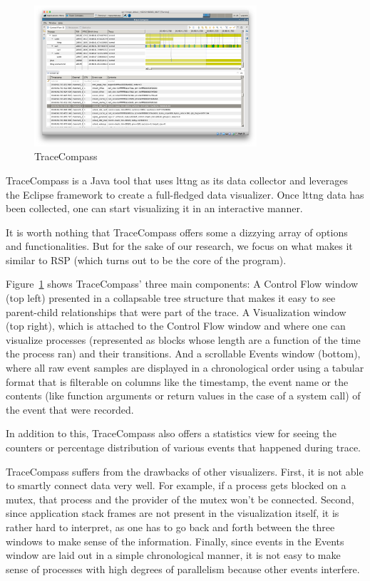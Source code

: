 \documentclass[10pt]{article}
\begin{document}
\begin{figure}[h]
\includegraphics[width=3.25in]{images/tracecompass}
\caption{TraceCompass}
\label{fig:traceCompass}
\end{figure}

TraceCompass\cite{traceCompass} is a Java tool that uses lttng as its data
collector and leverages the Eclipse framework to create a full-fledged data
visualizer. Once lttng data has been collected, one can start visualizing it in
an interactive manner.

It is worth nothing that TraceCompass offers some a dizzying array of options
and functionalities. But for the sake of our research, we focus on what makes
it similar to RSP (which turns out to be the core of the program).

Figure~\ref{fig:traceCompass} shows TraceCompass' three main components: A
Control Flow window (top left) presented in a collapsable tree structure that
makes it easy to see parent-child relationships that were part of the trace. A
Visualization window (top right), which is attached to the Control Flow window
and where one can visualize processes (represented as blocks whose length are a
function of the time the process ran) and their transitions. And a scrollable
Events window (bottom), where all raw event samples are displayed in a
chronological order using a tabular format that is filterable on columns like
the timestamp, the event name or the contents (like function arguments or
return values in the case of a system call) of the event that were recorded.

In addition to this, TraceCompass also offers a statistics view for seeing the
counters or percentage distribution of various events that happened during trace.

TraceCompass suffers from the drawbacks of other visualizers. First, it is not
able to smartly connect data very well. For example, if a process gets blocked
on a mutex, that process and the provider of the mutex won’t be connected.
Second, since application stack frames are not present in the visualization
itself, it is rather hard to interpret, as one has to go back and forth between
the three windows to make sense of the information. Finally, since events in
the Events window are laid out in a simple chronological manner, it is not easy
to make sense of processes with high degrees of parallelism because other
events interfere.
\end{document}
